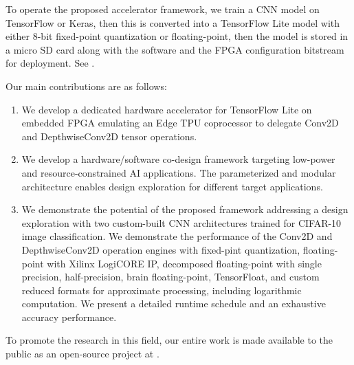 To operate the proposed accelerator framework, we train a CNN model on TensorFlow or Keras, then this is converted into a TensorFlow Lite model with either 8-bit fixed-point quantization or floating-point, then the model is stored in a micro SD card along with the software and the FPGA configuration bitstream for deployment. See .

Our main contributions are as follows:
\begin{enumerate}
	\item We develop a dedicated hardware accelerator for TensorFlow Lite on embedded FPGA emulating an Edge TPU coprocessor to delegate Conv2D and DepthwiseConv2D tensor operations.
	\item We develop a hardware/software co-design framework targeting low-power and resource-constrained AI applications. The parameterized and modular architecture enables design exploration for different target applications.
	\item We demonstrate the potential of the proposed framework addressing a design exploration with two custom-built CNN architectures trained for CIFAR-10 image classification. We demonstrate the performance of the Conv2D and DepthwiseConv2D operation engines with fixed-pint quantization, floating-point with Xilinx LogiCORE IP, decomposed floating-point with single precision, half-precision, brain floating-point, TensorFloat, and custom reduced formats for approximate processing, including logarithmic computation. We present a detailed runtime schedule and an exhaustive accuracy performance.
\end{enumerate}

To promote the research in this field, our entire work is made available to the public as an open-source project at .